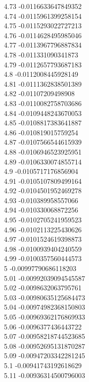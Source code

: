 {4.73	-0.0116633647849352\\
4.74	-0.0115961399258154\\
4.75	-0.0115293022727213\\
4.76	-0.0114628495985046\\
4.77	-0.0113967796887834\\
4.78	-0.011331090341873\\
4.79	-0.0112657793687183\\
4.8	-0.0112008445928149\\
4.81	-0.0111362838501389\\
4.82	-0.01107209498908\\
4.83	-0.0110082758703686\\
4.84	-0.0109448243670053\\
4.85	-0.0108817383641887\\
4.86	-0.010819015759254\\
4.87	-0.0107566544615939\\
4.88	-0.0106946523925951\\
4.89	-0.0106330074855714\\
4.9	-0.0105717176856904\\
4.91	-0.0105107809499164\\
4.92	-0.0104501952469278\\
4.93	-0.010389958557066\\
4.94	-0.010330068872256\\
4.95	-0.0102705241959523\\
4.96	-0.0102113225430626\\
4.97	-0.0101524619398873\\
4.98	-0.0100939404240559\\
4.99	-0.0100357560444573\\
5	-0.00997790686118203\\
5.01	-0.00992039094545587\\
5.02	-0.0098632063795761\\
5.03	-0.00980635125684473\\
5.04	-0.00974982368150803\\
5.05	-0.00969362176869933\\
5.06	-0.0096377436443722\\
5.07	-0.00958218744523685\\
5.08	-0.00952695131870287\\
5.09	-0.00947203342281245\\
5.1	-0.00941743192618629\\
5.11	-0.00936314500796003\\
}
